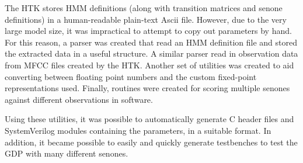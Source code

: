 	The HTK stores HMM definitions (along with transition matrices and senone definitions) in a human-readable plain-text Ascii file.  However, due to the very large model size, it was impractical to attempt to copy out parameters by hand.  For this reason, a parser was created that read an HMM definition file and stored the extracted data in a useful structure.  A similar parser read in observation data from MFCC files created by the HTK.  Another set of utilities was created to aid converting between floating point numbers and the custom fixed-point representations used.  Finally, routines were created for scoring multiple senones against different observations in software.

	Using these utilities, it was possible to automatically generate C header files and SystemVerilog modules containing the parameters, in a suitable format.  In addition, it became possible to easily and quickly generate testbenches to test the GDP with many different senones.

